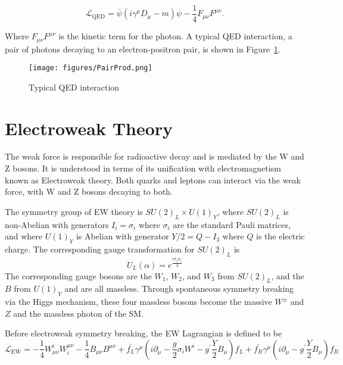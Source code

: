 \begin{equation}
\mathcal{L}_{\text{QED}} = \bar{\psi}\left(i\gamma^{\mu}D_{\mu} - m\right)\psi - \frac{1}{4}F_{\mu\nu}F^{\mu\nu}.
\end{equation} 

\noindent Where $F_{\mu\nu}F^{\mu\nu}$ is the kinetic term for the photon. A typical QED interaction, a pair of photons decaying to an electron-positron pair, is shown in Figure~\ref{fig:FeynmanQED}.

\begin{figure}
\centering
  \texttt{[image: figures/PairProd.png]}
  \caption{\label{fig:FeynmanQED} Typical QED interaction\cite{QEDFeynman}}
\end{figure}


\section{Electroweak Theory}
\label{sec:EW}

The weak force is responsible for radioactive decay and is mediated by the W and Z bosons. It is understood in terms of its unification with electromagnetism known as Electroweak theory. Both quarks and leptons can interact via the weak force, with W and Z bosons decaying to both. 

The symmetry group of EW theory is $SU(2)_{L} \times U(1)_{Y}$, where $SU(2)_{L}$ is non-Abelian with generators $I_{i} = \sigma_{i}$ where $\sigma_{i}$ are the standard Pauli matrices, and where $U(1)_{Y}$ is Abelian with generator $Y/2 = Q - I_{3}$ where $Q$ is the electric charge. The corresponding gauge transformation for $SU(2)_{L}$ is 
\begin{equation}
U_L(\alpha) = e^{\frac{i\sigma_j\alpha_j}{2}}
\end{equation}
\noindent The corresponding gauge bosons are the $W_{1}$, $W_{2}$, and $W_{3}$ from $SU(2)_{L}$, and the $B$ from $U(1)_{Y}$ and are all massless. Through spontaneous symmetry breaking via the Higgs mechanism, these four massless bosons become the massive $W^{\pm}$ and $Z$ and the massless photon of the SM.

Before electroweak symmetry breaking, the EW Lagrangian is defined to be\cite{srednicki}
\begin{equation}
\mathcal{L}_{\text{EW}} = -\frac{1}{4}W^{i}_{\mu\nu}W^{\mu\nu}_{i} - \frac{1}{4}B_{\mu\nu}B^{\mu\nu} + \bar{f_{L}}\gamma^{\mu}\left(i\partial_{\mu} - \frac{g}{2}\sigma_{i}W^{i} - g^{\prime}\frac{Y}{2}B_{\mu}\right)f_{L} + 
\bar{f_{R}}\gamma^{\mu}\left(i\partial_{\mu} - g^{\prime}\frac{Y}{2}B_{\mu}\right)f_{R}
\end{equation}


